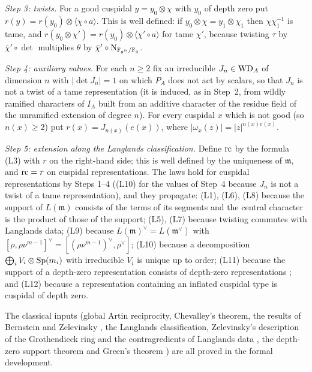 \begin{proofoutline}
\emph{Step 3: twists.} For a good cuspidal $y=y_0\otimes\chi$ with $y_0$ of depth zero put
$r(y)=r(y_0)\otimes\langle\chi\circ a\rangle$. This is well defined: if $y_0\otimes\chi=y_1\otimes\chi_1$
then $\chi\chi_1^{-1}$ is tame, and $r(y_0\otimes\chi')=r(y_0)\otimes\langle\chi'\circ a\rangle$ for tame
$\chi'$, because twisting $\tau$ by $\bar\chi'\circ\det$ multiplies $\theta$ by
$\bar\chi'\circ\operatorname{N}_{\mathbb{F}_{g^n}/\mathbb{F}_g}$.

\emph{Step 4: auxiliary values.} For each $n\ge2$ fix an irreducible $J_n\in\mathrm{WD}_A$ of dimension
$n$ with $|\det J_n|=1$ on which $P_A$ does not act by scalars, so that $J_n$ is not a twist of a tame
representation (it is induced, as in Step~2, from wildly ramified characters of $I_A$ built from an
additive character of the residue field of the unramified extension of degree $n$). For every
cuspidal $x$ which is not good (so $n(x)\ge2$) put $r(x)=J_{n(x)}(e(x))$, where
$|\omega_x(z)|=|z|^{n(x)e(x)}$.

\emph{Step 5: extension along the Langlands classification.} Define $\mathrm{rc}$ by the formula (L3)
with $r$ on the right-hand side; this is well defined by the uniqueness of $\mathfrak m$, and
$\mathrm{rc}=r$ on cuspidal representations. The laws hold for cuspidal representations by Steps 1--4
((L10) for the values of Step~4 because $J_n$ is not a twist of a tame representation), and they
propagate: (L1), (L6), (L8) because the support of $L(\mathfrak m)$ consists of the terms of its segments
and the central character is the product of those of the support; (L5), (L7) because twisting
commutes with Langlands data; (L9) because $L(\mathfrak m)^\vee=L(\mathfrak m^\vee)$ with
$[\rho,\rho\nu^{m-1}]^\vee=[(\rho\nu^{m-1})^\vee,\rho^\vee]$; (L10) because a decomposition
$\bigoplus_iV_i\otimes\operatorname{Sp}(m_i)$ with irreducible $V_i$ is unique up to order; (L11) because the
support of a depth-zero representation consists of depth-zero representations \cite{MoyPrasad1996};
and (L12) because a representation containing an inflated cuspidal type is cuspidal of depth zero.

The classical inputs (global Artin reciprocity, Chevalley's theorem, the results of Bernstein and
Zelevinsky \cite{BernsteinZelevinsky1976,BernsteinZelevinsky1977}, the Langlands classification,
Zelevinsky's description of the Grothendieck ring and the contragredients of Langlands data
\cite{Zelevinsky1980}, the depth-zero support theorem \cite{MoyPrasad1996} and Green's theorem
\cite{Green1955}) are all proved in the formal development.
\end{proofoutline}

